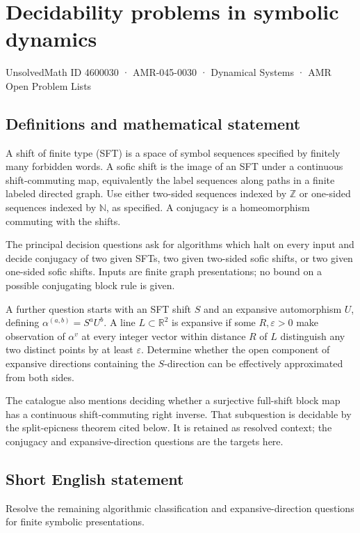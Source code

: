 \documentclass[11pt,a4paper]{article}
\begin{document}
\section*{Decidability problems in symbolic dynamics}\label{4600030}
{\small UnsolvedMath ID 4600030 · AMR-045-0030 · Dynamical Systems · AMR Open Problem Lists}
\subsection{Definitions and mathematical statement}
A shift of finite type (SFT) is a space of symbol sequences specified by
finitely many forbidden words. A sofic shift is the image of an SFT under
a continuous shift-commuting map, equivalently the label sequences along
paths in a finite labeled directed graph. Use either two-sided sequences
indexed by $\mathbb Z$ or one-sided sequences indexed by $\mathbb N$, as
specified. A conjugacy is a homeomorphism commuting with the shifts.

The principal decision questions ask for algorithms which halt on every
input and decide conjugacy of two given SFTs, two given two-sided sofic
shifts, or two given one-sided sofic shifts. Inputs are finite graph
presentations; no bound on a possible conjugating block rule is given.

A further question starts with an SFT shift $S$ and an expansive
automorphism $U$, defining $\alpha^{(a,b)}=S^aU^b$. A line $L\subset
\mathbb R^2$ is expansive if some $R,\varepsilon>0$ make observation of
$\alpha^v$ at every integer vector within distance $R$ of $L$ distinguish
any two distinct points by at least $\varepsilon$. Determine whether the
open component of expansive directions containing the $S$-direction can
be effectively approximated from both sides.

The catalogue also mentions deciding whether a surjective full-shift
block map has a continuous shift-commuting right inverse. That subquestion
is decidable by the split-epicness theorem cited below. It is retained
as resolved context; the conjugacy and expansive-direction questions
are the targets here.
\subsection{Short English statement}
Resolve the remaining algorithmic classification and expansive-direction questions for finite symbolic presentations.
\end{document}
